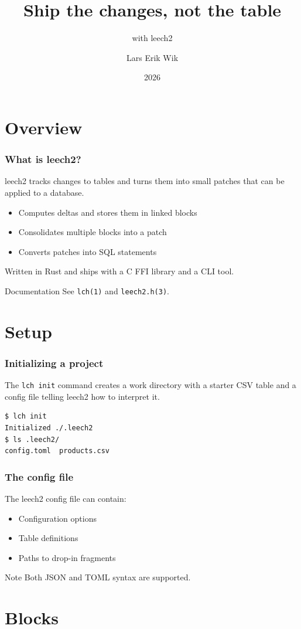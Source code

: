\documentclass{beamer}
\title{Ship the changes, not the table}
\subtitle{with leech2}
\author{Lars Erik Wik}
\institute{Northern.tech}
\date{2026}
\begin{document}
\frame{\titlepage}

\section{Overview}

\begin{frame}
\frametitle{What is leech2?}
leech2 tracks changes to tables and turns them into small patches that can be applied
to a database.
\begin{itemize}
\item Computes deltas and stores them in linked blocks
\item Consolidates multiple blocks into a patch
\item Converts patches into SQL statements
\end{itemize}
\bigskip
Written in Rust and ships with a C FFI library and a CLI tool.
\begin{block}{Documentation}
See \texttt{lch(1)} and \texttt{leech2.h(3)}.
\end{block}
\end{frame}

\section{Setup}

\begin{frame}[fragile]
\frametitle{Initializing a project}
The \texttt{lch init} command creates a work directory with a starter CSV
table and a config file telling leech2 how to interpret it.
\begin{verbatim}
$ lch init
Initialized ./.leech2
$ ls .leech2/
config.toml  products.csv
\end{verbatim}
\end{frame}

\begin{frame}
\frametitle{The config file}
The leech2 config file can contain:
\begin{itemize}
\item Configuration options
\item Table definitions
\item Paths to drop-in fragments
\end{itemize}
\bigskip
\begin{block}{Note}
Both JSON and TOML syntax are supported.
\end{block}
\end{frame}

\section{Blocks}
\end{document}
